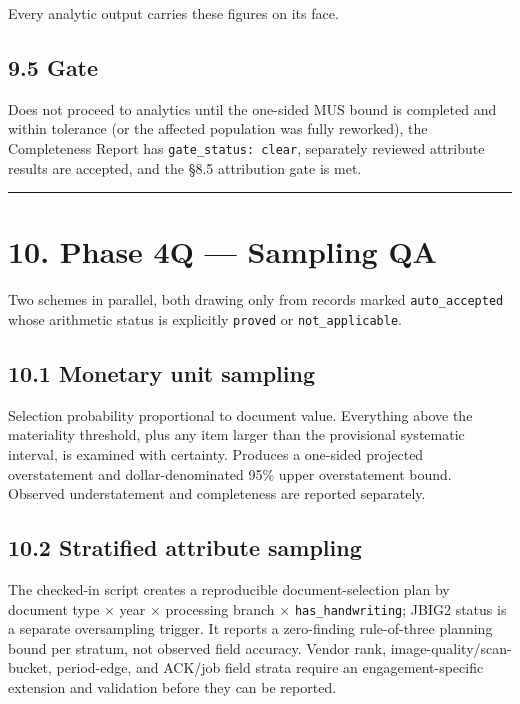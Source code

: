 \documentclass[
]{article}
\begin{document}
Every analytic output carries these figures on its face.

\subsection{9.5 Gate}\label{gate}

Does not proceed to analytics until the one-sided MUS bound is completed
and within tolerance (or the affected population was fully reworked),
the Completeness Report has \texttt{gate\_\allowbreak{}status: clear},
separately reviewed attribute results are accepted, and the §8.5
attribution gate is met.

\begin{center}\rule{0.5\linewidth}{0.5pt}\end{center}

\section{10. Phase 4Q --- Sampling QA}\label{phase-4q-sampling-qa}

Two schemes in parallel, both drawing only from records marked
\texttt{auto\_\allowbreak{}accepted} whose arithmetic status is
explicitly \texttt{proved} or \texttt{not\_\allowbreak{}applicable}.

\subsection{10.1 Monetary unit sampling}\label{monetary-unit-sampling}

Selection probability proportional to document value. Everything above
the materiality threshold, plus any item larger than the provisional
systematic interval, is examined with certainty. Produces a one-sided
projected overstatement and dollar-denominated 95\% upper overstatement
bound. Observed understatement and completeness are reported separately.

\subsection{10.2 Stratified attribute
sampling}\label{stratified-attribute-sampling}

The checked-in script creates a reproducible document-selection plan by
document type × year × processing branch ×
\texttt{has\_\allowbreak{}handwriting}; JBIG2 status is a separate
oversampling trigger. It reports a zero-finding rule-of-three planning
bound per stratum, not observed field accuracy. Vendor rank,
image-quality/scan-bucket, period-edge, and ACK/job field strata require
an engagement-specific extension and validation before they can be
reported.
\end{document}
